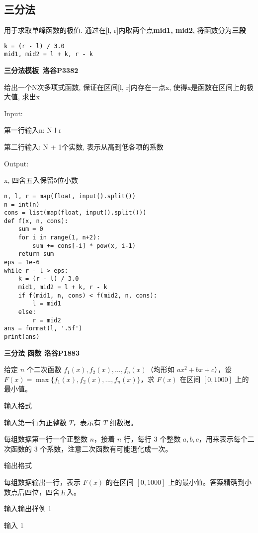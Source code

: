 \documentclass[../main]{subfiles}
\begin{document}
\begin{sloppy}
\subsection{三分法}

用于求取单峰函数的极值. 通过在[l, r]内取两个点\textbf{mid1, mid2}, 将函数分为\textbf{三段}

\begin{lstlisting}[style = Python]
k = (r - l) / 3.0
mid1, mid2 = l + k, r - k
\end{lstlisting}

\newpage

\textbf{三分法模板\ 洛谷P3382}

给出一个N次多项式函数, 保证在区间[l, r]内存在一点x, 使得x是函数在区间上的极大值, 求出x

Input:

第一行输入n: N l r

第二行输入: N + 1个实数, 表示从高到低各项的系数

Output:

x, 四舍五入保留5位小数

\begin{lstlisting}[style = Python]
n, l, r = map(float, input().split())
n = int(n)
cons = list(map(float, input().split()))
def f(x, n, cons):
    sum = 0
    for i in range(1, n+2):
        sum += cons[-i] * pow(x, i-1)
    return sum
eps = 1e-6
while r - l > eps:
    k = (r - l) / 3.0
    mid1, mid2 = l + k, r - k
    if f(mid1, n, cons) < f(mid2, n, cons):
        l = mid1
    else:
        r = mid2
ans = format(l, '.5f')
print(ans)
\end{lstlisting}

\newpage

\textbf{三分法 函数 洛谷P1883}

给定 $n$ 个二次函数 $f_1(x),f_2(x),\dots,f_n(x)$（均形如 $ax^2+bx+c$），设 $F(x)=\max\{f_1(x),f_2(x),...,f_n(x)\}$，求 $F(x)$ 在区间 $[0,1000]$ 上的最小值。

输入格式

输入第一行为正整数 $T$，表示有 $T$ 组数据。

每组数据第一行一个正整数 $n$，接着 $n$ 行，每行 $3$ 个整数 $a,b,c$，用来表示每个二次函数的 $3$ 个系数，注意二次函数有可能退化成一次。

输出格式

每组数据输出一行，表示 $F(x)$ 的在区间 $[0,1000]$ 上的最小值。答案精确到小数点后四位，四舍五入。

输入输出样例 1

输入 1


\end{sloppy}
\end{document}
